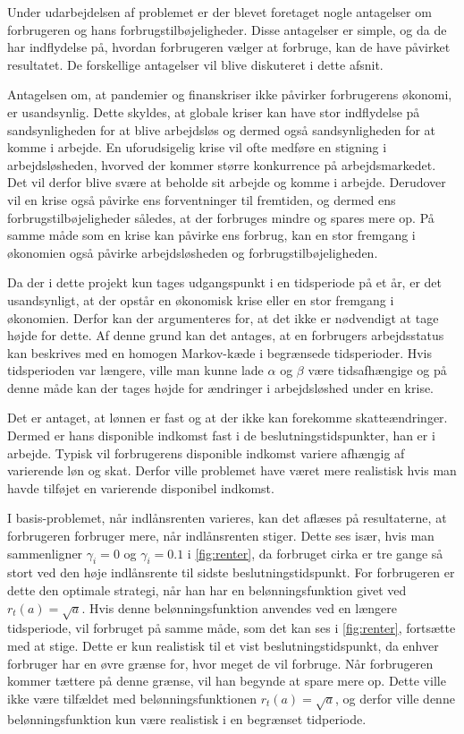 Under udarbejdelsen af problemet er der blevet foretaget nogle antagelser om forbrugeren og hans forbrugstilbøjeligheder. Disse antagelser er simple, og da de har indflydelse på, hvordan forbrugeren vælger at forbruge, kan de have påvirket resultatet. De forskellige antagelser vil blive diskuteret i dette afsnit.

Antagelsen om, at pandemier og finanskriser ikke påvirker forbrugerens økonomi, er usandsynlig. Dette skyldes, at globale kriser kan have stor indflydelse på sandsynligheden for at blive arbejdsløs og dermed også sandsynligheden for at komme i arbejde. En uforudsigelig krise vil ofte medføre en stigning i arbejdsløsheden, hvorved der kommer større konkurrence på arbejdsmarkedet. Det vil derfor blive svære at beholde sit arbejde og komme i arbejde. Derudover vil en krise også påvirke ens forventninger til fremtiden, og dermed ens forbrugstilbøjeligheder således, at der forbruges mindre og spares mere op. På samme måde som en krise kan påvirke ens forbrug, kan en stor fremgang i økonomien også påvirke arbejdsløsheden og forbrugstilbøjeligheden. 

Da der i dette projekt kun tages udgangspunkt i en tidsperiode på et år, er det usandsynligt, at der opstår en økonomisk krise eller en stor fremgang i økonomien. Derfor kan der argumenteres for, at det ikke er nødvendigt at tage højde for dette. Af denne grund kan det antages, at en forbrugers arbejdsstatus kan beskrives med en homogen Markov-kæde i begrænsede tidsperioder. Hvis tidsperioden var længere, ville man kunne lade $\alpha$ og $\beta$ være tidsafhængige og på denne måde kan der tages højde for ændringer i arbejdsløshed under en krise. 

Det er antaget, at lønnen er fast og at der ikke kan forekomme skatteændringer. Dermed er hans disponible indkomst fast i de beslutningstidspunkter, han er i arbejde. Typisk vil forbrugerens disponible indkomst variere afhængig af varierende løn og skat. Derfor ville problemet have været mere realistisk hvis man havde tilføjet en varierende disponibel indkomst.  

I basis-problemet, når indlånsrenten varieres, kan det aflæses på resultaterne, at forbrugeren forbruger mere, når indlånsrenten stiger. Dette ses især, hvis man sammenligner $\gamma_i=0$ og $\gamma_i=0.1$ i \autoref{fig:renter}, da forbruget cirka er tre gange så stort ved den høje indlånsrente til sidste beslutningstidspunkt. For forbrugeren er dette den optimale strategi, når han har en belønningsfunktion givet ved $r_t(a) = \sqrt{a}$. Hvis denne belønningsfunktion anvendes ved en længere tidsperiode, vil forbruget på samme måde, som det kan ses i \autoref{fig:renter}, fortsætte med at stige. Dette er kun realistisk til et vist beslutningstidspunkt, da enhver forbruger har en øvre grænse for, hvor meget de vil forbruge. Når forbrugeren kommer tættere på denne grænse, vil han begynde at spare mere op. Dette ville ikke være tilfældet med belønningsfunktionen $r_t(a) = \sqrt{a}$, og derfor ville denne belønningsfunktion kun være realistisk i en begrænset tidperiode.

